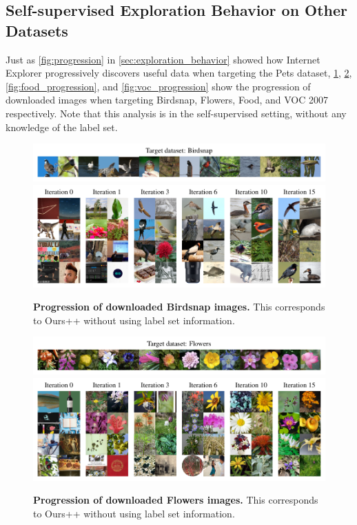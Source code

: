 \subsection{Self-supervised Exploration Behavior on Other Datasets} 
\label{sec:progression_continued}
Just as \cref{fig:progression} in \cref{sec:exploration_behavior} showed how Internet Explorer progressively discovers useful data when targeting the Pets dataset, \cref{fig:birdsnap_progression}, \cref{fig:flowers_progression}, \cref{fig:food_progression}, and \cref{fig:voc_progression} show the progression of downloaded images when targeting Birdsnap, Flowers, Food, and VOC 2007 respectively. Note that this analysis is in the self-supervised setting, without any knowledge of the label set. 

\begin{figure}
    \centering
    \includegraphics{figures/birdsnap_targets.pdf} \\
    \vspace{-0.8em}
    \includegraphics{figures/birdsnap-progression-1146-2col.pdf}
    \caption{\textbf{Progression of downloaded Birdsnap images.} This corresponds to Ours++ without using label set information. }
    \label{fig:birdsnap_progression}
\end{figure}

\begin{figure}
    \centering
    \includegraphics{figures/flowers_targets.pdf} \\
    \vspace{-0.8em}
    \includegraphics{figures/flowers-progression-1150-2col.pdf}
    \caption{\textbf{Progression of downloaded Flowers images.} This corresponds to Ours++ without using label set information. }
    \label{fig:flowers_progression}
\end{figure}

